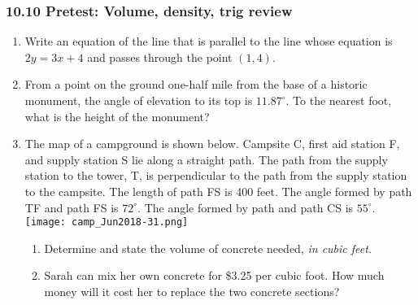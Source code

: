 \documentclass[12pt, twoside]{article}
\begin{document}
\subsubsection*{10.10 Pretest: Volume, density, trig review}
 \begin{enumerate}

  \item Write an equation of the line that is parallel to the line whose equation is $2y=3x+4$ and passes through the point $(1,4)$.

  \item From a point on the ground one-half mile from the base of a historic monument, the angle of elevation to its top is $11.87^\circ$. To the nearest foot, what is the height of the monument?\\[1cm]
    \vspace{3cm}

  \item The map of a campground is shown below. Campsite C, first aid station F, and supply station S lie along a straight path. The path from the supply station to the tower, T, is perpendicular to the path from the supply station to the campsite. The length of path FS is 400 feet. The angle formed by path TF and path FS is $72^\circ$. The angle formed by path   and path CS is $55^\circ$.\\[0.5cm]
  \texttt{[image: camp\_Jun2018-31.png]}
    \begin{enumerate}
      \item Determine and state the volume of concrete needed, \emph{in cubic feet}. \vspace{1cm}
      \item Sarah can mix her own concrete for \$3.25 per cubic foot. How much money will it cost her to replace the two concrete sections?
  \end{enumerate} \vspace{2.5cm}


\end{enumerate}
\end{document}
